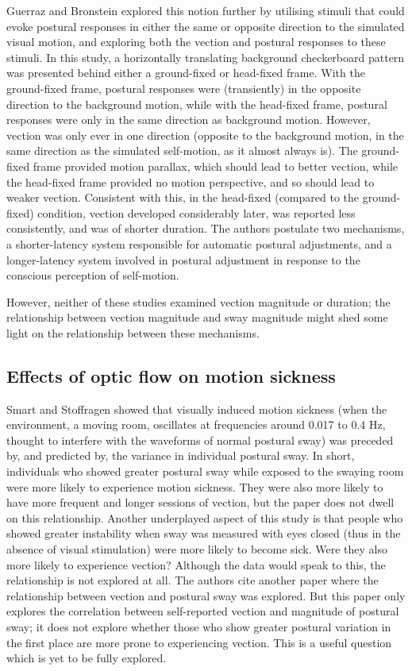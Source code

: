 \documentclass[11pt]{article}
\begin{document}
\begin{linenumbers}
Guerraz and Bronstein \cite{Guerraz:2008vo} explored this notion further by utilising stimuli that could evoke postural responses in either the same or opposite direction to the simulated visual motion, and exploring both the vection and postural responses to these stimuli. In this study, a horizontally translating background checkerboard pattern was presented behind either a ground-fixed or head-fixed frame. With the ground-fixed frame, postural responses were (transiently) in the opposite direction to the background motion, while with the head-fixed frame, postural responses were only in the same direction as background motion. However, vection was only ever in one direction (opposite to the background motion, in the same direction as the simulated self-motion, as it almost always is). The ground-fixed frame provided motion parallax, which should lead to better vection, while the head-fixed frame provided no motion perspective, and so should lead to weaker vection. Consistent with this, in the head-fixed (compared to the ground-fixed) condition, vection developed considerably later, was reported less consistently, and was of shorter duration. The authors postulate two mechanisms, a shorter-latency system responsible for automatic postural adjustments, and a longer-latency system involved in postural adjustment in response to the conscious perception of self-motion. 

However, neither of these studies examined vection magnitude or duration; the relationship between vection magnitude and sway magnitude might shed some light on the relationship between these mechanisms.
 

\subsection*{Effects of optic flow on motion sickness}
Smart and Stoffragen \cite{SmartJr:2002ef} showed that visually induced motion sickness (when the environment, a moving room, oscillates at frequencies around 0.017 to 0.4 Hz, thought to interfere with the waveforms of normal postural sway) was preceded by, and predicted by, the variance in individual postural sway. In short, individuals who showed greater postural sway while exposed to the swaying room were more likely to experience motion sickness. They were also more likely to have more frequent and longer sessions of vection, but the paper does not dwell on this relationship. Another underplayed aspect of this study is that people who showed greater instability when sway was measured with eyes closed (thus in the absence of visual stimulation) were more likely to become sick. Were they also more likely to experience vection? Although the data would speak to this, the relationship is not explored at all. The authors cite another paper \cite{Kuno:1999vh} where the relationship between vection and postural sway was explored. But this paper only explores the correlation between self-reported vection and magnitude of postural sway; it does not explore whether those who show greater postural variation in the first place are more prone to experiencing vection. This is a useful question which is yet to be fully explored. %


\end{linenumbers}
\end{document}
